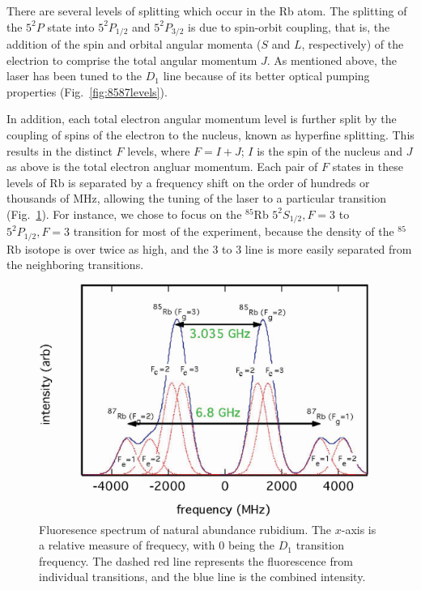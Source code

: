 There are several levels of splitting which occur in the Rb atom. The
splitting of the $5^2P$ state into $5^2P_{1/2}$ and $5^2P_{3/2}$ is
due to spin-orbit coupling, that is, the addition of the spin and
orbital angular momenta ($S$ and $L$, respectively) of the electrion
to comprise the total angular momentum $J$. As mentioned above, the
laser has been tuned to the $D_1$ line because of its better optical
pumping properties (Fig.~\ref{fig:8587levels}).

In addition, each total electron angular momentum level is further
split by the coupling of spins of the electron to the nucleus, known
as hyperfine splitting. This results in the distinct $F$ levels, where
$F = I + J$; $I$ is the spin of the nucleus and $J$ as above is the
total electron angluar momentum. Each pair of $F$ states in these
levels of Rb is separated by a frequency shift on the order of
hundreds or thousands of MHz, allowing the tuning of the laser to a
particular transition (Fig.~\ref{fig:fluor}). For instance, we
chose to focus on the $^{85}$Rb $5^2S_{1/2}, F = 3$ to $5^2P_{1/2}, F
= 3$ transition for most of the experiment, because the density of the
$^{85}$Rb isotope is over twice as high, and the $3$ to $3$ line is
more easily separated from the neighboring transitions.

\begin{figure}[h]
\begin{center}
\includegraphics[height=3in]{figures/fluorescence.eps}
\caption{\small{Fluoresence spectrum of natural abundance rubidium. The $x$-axis is a relative measure of frequecy, with $0$ being the $D_1$ transition frequency. The dashed red line represents the fluorescence from individual transitions, and the blue line is the combined intensity.}}
\label{fig:fluor}
\end{center}
\end{figure}

